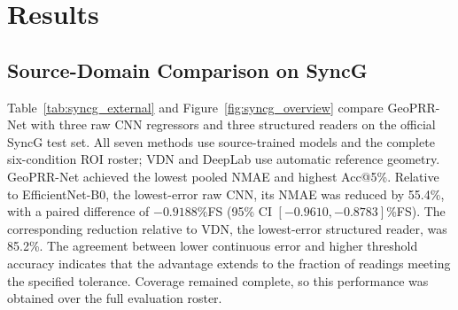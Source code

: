 \documentclass[electronics,article,submit,oneauthor]{Definitions/mdpi}
\newcommand{\modelname}{GeoPRR-Net\xspace}
\begin{document}
\section{Results}
\label{sec:results}

\subsection{Source-Domain Comparison on SyncG}
\label{subsec:comparisons}
\label{subsec:source}
\label{subsec:syncg_results}

Table~\ref{tab:syncg_external} and Figure~\ref{fig:syncg_overview} compare \modelname with three raw CNN regressors and three structured readers on the official SyncG test set. All seven methods use source-trained models and the complete six-condition ROI roster; VDN and DeepLab use automatic reference geometry. \modelname achieved the lowest pooled NMAE and highest Acc@5\%. Relative to EfficientNet-B0, the lowest-error raw CNN, its NMAE was reduced by 55.4\%, with a paired difference of $-0.9188$\%FS (95\% CI $[-0.9610,-0.8783]$\%FS). The corresponding reduction relative to VDN, the lowest-error structured reader, was 85.2\%. The agreement between lower continuous error and higher threshold accuracy indicates that the advantage extends to the fraction of readings meeting the specified tolerance. Coverage remained complete, so this performance was obtained over the full evaluation roster.
\end{document}
